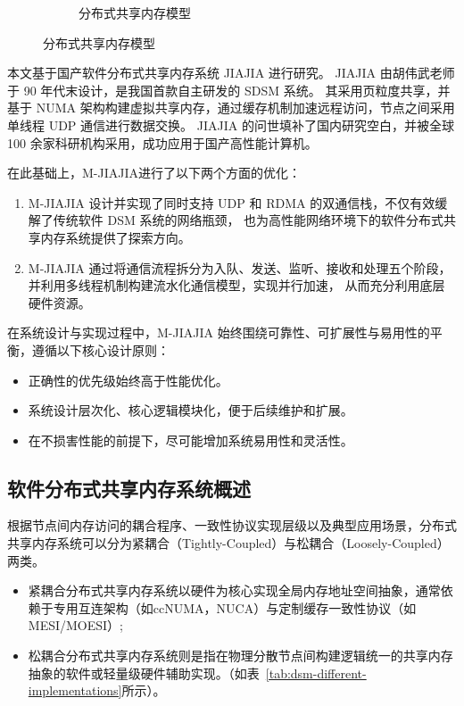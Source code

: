 {\begin{figure}[!htbp]
\begin{subfigure}[b]{0.6\textwidth}
      \caption{分布式共享内存模型}
      \label{fig:dsm}
    \end{subfigure}
    \label{fig:model}
  \end{figure}

  本文基于国产软件分布式共享内存系统 JIAJIA\citep{huweiwu2001sma,huweiwu2024ca,1999huweiwuJIAJIA} 进行研究。
  JIAJIA 由胡伟武老师于 90 年代末设计，是我国首款自主研发的 SDSM 系统。
  其采用页粒度共享，并基于 NUMA 架构构建虚拟共享内存，通过缓存机制加速远程访问，节点之间采用单线程 UDP 通信进行数据交换。
  JIAJIA 的问世填补了国内研究空白，并被全球 100 余家科研机构采用，成功应用于国产高性能计算机。

  在此基础上，M-JIAJIA进行了以下两个方面的优化：
  \begin{enumerate}
    \item M-JIAJIA 设计并实现了同时支持 UDP 和 RDMA 的双通信栈，不仅有效缓解了传统软件 DSM 系统的网络瓶颈，
          也为高性能网络环境下的软件分布式共享内存系统提供了探索方向。
    \item M-JIAJIA 通过将通信流程拆分为入队、发送、监听、接收和处理五个阶段，并利用多线程机制构建流水化通信模型，实现并行加速，
          从而充分利用底层硬件资源。
  \end{enumerate}

  在系统设计与实现过程中，M-JIAJIA 始终围绕可靠性、可扩展性与易用性的平衡，遵循以下核心设计原则：
  \begin{itemize}
    \item 正确性的优先级始终高于性能优化。
    \item 系统设计层次化、核心逻辑模块化，便于后续维护和扩展。
    \item 在不损害性能的前提下，尽可能增加系统易用性和灵活性。
  \end{itemize}

  \subsection{软件分布式共享内存系统概述}
  根据节点间内存访问的耦合程序、一致性协议实现层级以及典型应用场景，分布式共享内存系统可以分为紧耦合（Tightly-Coupled）与松耦合（Loosely-Coupled）两类。
  \begin{itemize}
    \item 紧耦合分布式共享内存系统以硬件为核心实现全局内存地址空间抽象，通常依赖于专用互连架构（如ccNUMA，NUCA）与定制缓存一致性协议（如MESI/MOESI）;
    \item 松耦合分布式共享内存系统则是指在物理分散节点间构建逻辑统一的共享内存抽象的软件或轻量级硬件辅助实现。（如表~\ref{tab:dsm-different-implementations}所示）。
  \end{itemize}

}
